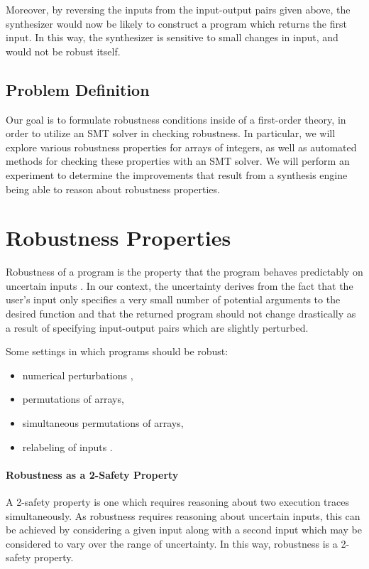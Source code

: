 \documentclass{llncs}
\begin{document}
Moreover, by reversing the inputs from the input-output pairs given above, the synthesizer would now be likely to construct a program which returns the first input.  In this way, the synthesizer is sensitive to small changes in input, and would not be robust itself.

\subsection{Problem Definition}

Our goal is to formulate robustness conditions inside of a first-order theory, in order to utilize an SMT solver in checking robustness.  In particular, we will explore various robustness properties for arrays of integers, as well as automated methods for checking these properties with an SMT solver.  We will perform an experiment to determine the improvements that result from a synthesis engine being able to reason about robustness properties.

\section{Robustness Properties}

Robustness of a program is the property that the program behaves predictably on uncertain inputs \cite{chaudhuri12}.  In our context, the uncertainty derives from the fact that the user's input only specifies a very small number of potential arguments to the desired function and that the returned program should not change drastically as a result of specifying input-output pairs which are slightly perturbed.

Some settings in which programs should be robust:
\begin{itemize}
\item numerical perturbations \cite{samanta14,chaudhuri10,chaudhuri11},
\item permutations of arrays,
\item simultaneous permutations of arrays,
\item relabeling of inputs \cite{zapponi03}.
\end{itemize}

\paragraph{Robustness as a 2-Safety Property}
A 2-safety property is one which requires reasoning about two execution traces simultaneously.  As robustness requires reasoning about uncertain inputs, this can be achieved by considering a given input along with a second input which may be considered to vary over the range of uncertainty.  In this way, robustness is a 2-safety property.
\end{document}
